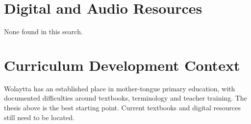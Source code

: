 \documentclass[12pt]{article}
\begin{document}
\section{Digital and Audio Resources}
None found in this search.

\section{Curriculum Development Context}
Wolaytta has an established place in mother-tongue primary education, with documented difficulties around textbooks, terminology and teacher training. The thesis above is the best starting point. Current textbooks and digital resources still need to be located.
\end{document}
